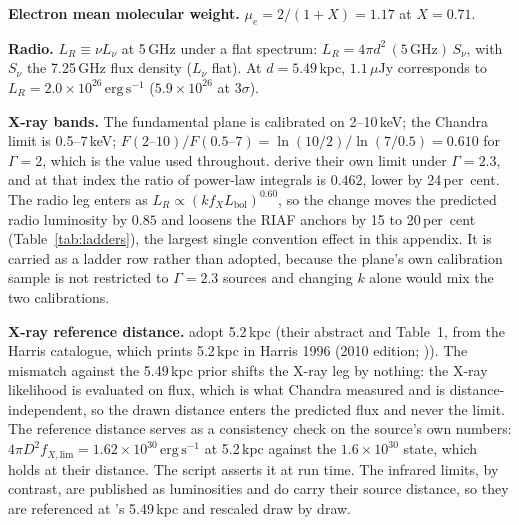 \documentclass[11pt]{article}
\begin{document}
\textbf{Electron mean molecular weight.} $\mu_{e} = 2/(1+X) = 1.17$ at $X = 0.71$.

\textbf{Radio.} $L_{R} \equiv \nu L_{\nu}$ at 5\,GHz under a flat spectrum: $L_{R} = 4\pi d^{2}\,(5\,\mathrm{GHz})\,S_{\nu}$, with $S_{\nu}$ the 7.25\,GHz flux density ($L_{\nu}$ flat). At $d = 5.49$\,kpc, $1.1\,\mu$Jy corresponds to $L_{R} = 2.0\times10^{26}\,\mathrm{erg\,s^{-1}}$ ($5.9\times10^{26}$ at $3\sigma$).

\textbf{X-ray bands.} The fundamental plane is calibrated on 2--10\,keV; the Chandra limit is 0.5--7\,keV; $F(2\text{--}10)/F(0.5\text{--}7) = \ln(10/2)/\ln(7/0.5) = 0.610$ for $\Gamma = 2$, which is the value used throughout. \citet{Haggard2013} derive their own limit under $\Gamma = 2.3$, and at that index the ratio of power-law integrals is $0.462$, lower by 24\,per~cent. The radio leg enters as $L_{R} \propto (k f_{X} L_{\mathrm{bol}})^{0.60}$, so the change moves the predicted radio luminosity by $0.85$ and loosens the RIAF anchors by 15 to 20\,per~cent (Table~\ref{tab:ladders}), the largest single convention effect in this appendix. It is carried as a ladder row rather than adopted, because the plane's own calibration sample is not restricted to $\Gamma = 2.3$ sources and changing $k$ alone would mix the two calibrations.

\textbf{X-ray reference distance.} \citet{Haggard2013} adopt 5.2\,kpc (their abstract and Table~1, from the Harris catalogue, which prints 5.2\,kpc in Harris 1996 (2010 edition; \citealp{Harris2010})). The mismatch against the 5.49\,kpc prior shifts the X-ray leg by nothing: the X-ray likelihood is evaluated on flux, which is what Chandra measured and is distance-independent, so the drawn distance enters the predicted flux and never the limit. The reference distance serves as a consistency check on the source's own numbers: $4\pi D^{2} f_{X,\mathrm{lim}} = 1.62\times10^{30}\,\mathrm{erg\,s^{-1}}$ at 5.2\,kpc against the $1.6\times10^{30}$ \citet{Haggard2013} state, which holds at their distance. The script asserts it at run time. The infrared limits, by contrast, are published as luminosities and do carry their source distance, so they are referenced at \citeauthor{Chen2025JWST}'s 5.49\,kpc and rescaled draw by draw.
\end{document}
